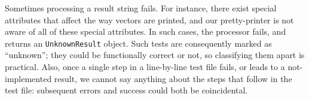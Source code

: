 \documentclass[
    sigplan,
    10pt,
    review, %
    natbib=false %
 ]{acmart}
\newcommand\mb[1]{\todo[color=purple!20,size=\scriptsize]{#1}}
\newcommand\CoqR{CoqR}
\begin{document}
Sometimes processing a result string fails.
For instance, there exist special attributes that affect
the way vectors are printed, and our pretty-printer is not aware of all of these special attributes. In such cases, the processor fails, and returns an \texttt{UnknownResult} object. Such tests are consequently marked as ``unknown''; they could be functionally correct or not, so classifying them apart is practical.
%
%
Also, once a single step in a line-by-line test file fails, or leads to a not-implemented result, we cannot say anything about the steps that follow in the test file: subsequent errors and success could both be coincidental.
\end{document}

